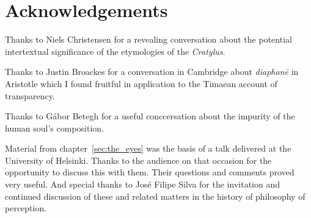 \chapter*{Acknowledgements} %
\label{cha:acknowledgements}

Thanks to Niels Christensen for a revealing conversation about the potential intertextual significance of the etymologies of the \emph{Cratylus}.

Thanks to Justin Broackes for a conversation in Cambridge about \emph{diaphanē} in Aristotle which I found fruitful in application to the Timaean account of transparency.

Thanks to Gábor Betegh for a useful conccersation about the impurity of the human soul's composition.

Material from chapter~\ref{sec:the_eyes} was the basis of a talk delivered at the University of Helsinki. Thanks to the audience on that occasion for the opportunity to discuss this with them. Their questions and comments proved very useful. And special thanks to Jos\'{e} Filipe Silva for the invitation and continued discussion of these and related matters in the history of philosophy of perception.

